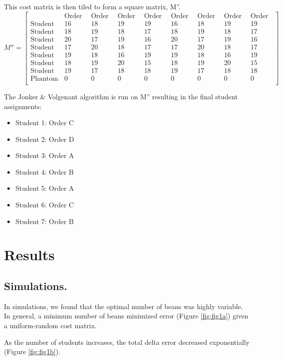 \documentclass{article}
\begin{document}
This cost matrix is then tiled to form a square matrix, M''.
$$M'' = 
\begin{bmatrix}
    & \text{Order A} & \text{Order B} & \text{Order C} & \text{Order D} & \text{Order A} & \text{Order B} & \text{Order C} & \text{Order D} \\
\text{Student 1} & 16 & 18 & 19 & 19 & 16 & 18 & 19 & 19 \\
\text{Student 2} & 18 & 19 & 18 & 17 & 18 & 19 & 18 & 17 \\
\text{Student 3} & 20 & 17 & 19 & 16 & 20 & 17 & 19 & 16 \\
\text{Student 4} & 17 & 20 & 18 & 17 & 17 & 20 & 18 & 17 \\
\text{Student 5} & 19 & 18 & 16 & 19 & 19 & 18 & 16 & 19 \\
\text{Student 6} & 18 & 19 & 20 & 15 & 18 & 19 & 20 & 15 \\
\text{Student 7} & 19 & 17 & 18 & 18 & 19 & 17 & 18 & 18 \\
\text{Phantom} & 0 & 0 & 0 & 0 & 0 & 0 & 0 & 0 \\
\end{bmatrix}
$$

The Jonker \& Volgenant algorithm is run on M'' resulting in the final student assignments:
\begin{itemize}
\item Student 1: Order C
\item Student 2: Order D
\item Student 3: Order A
\item Student 4: Order B
\item Student 5: Order A
\item Student 6: Order C
\item Student 7: Order B
\end{itemize}

\section{Results}
\subsection{Simulations.}
In simulations, we found that the optimal number of beans was highly variable. In general, a minimum number of beans minimized error (Figure \ref{fig:fig1a}) given a uniform-random cost matrix.

As the number of students increases, the total delta error decreased exponentially (Figure \ref{fig:fig1b}).
\end{document}
